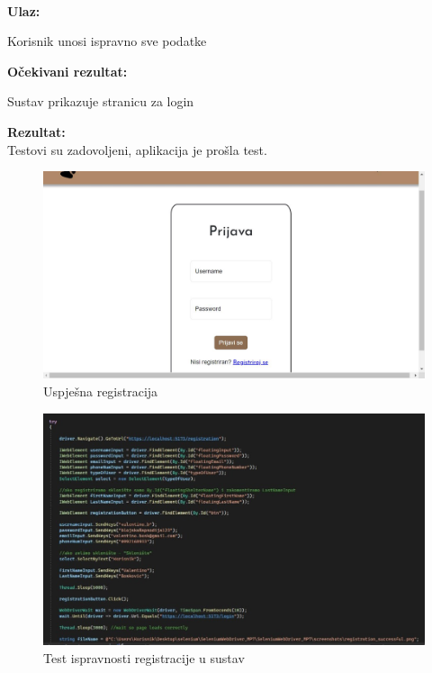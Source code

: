 			\noindent {}\\
			\textbf{Ulaz: }	
			\begin{packed_enum}
				\item Korisnik unosi ispravno sve podatke
				
			\end{packed_enum}
			
			\noindent \textbf{Očekivani rezultat:}
			
			\begin{packed_enum}
				\item Sustav prikazuje stranicu za login
				
			\end{packed_enum}
			
			\noindent \textbf{Rezultat:}\\
			Testovi su zadovoljeni, aplikacija je prošla test.\\
			\begin{figure}[H]
				\includegraphics[width=\textwidth]{uspjesna_registracija.JPEG}
				\centering
				\caption{Uspješna registracija}
				\label{fig:uspjesnaregistracija}
			\end{figure}
			\begin{figure}[H]
				\includegraphics[width=\textwidth]{2test_registration_1.JPEG}
				\centering
				\caption{Test ispravnosti registracije u sustav}
				\label{fig:testregistracija}
			\end{figure}
			
